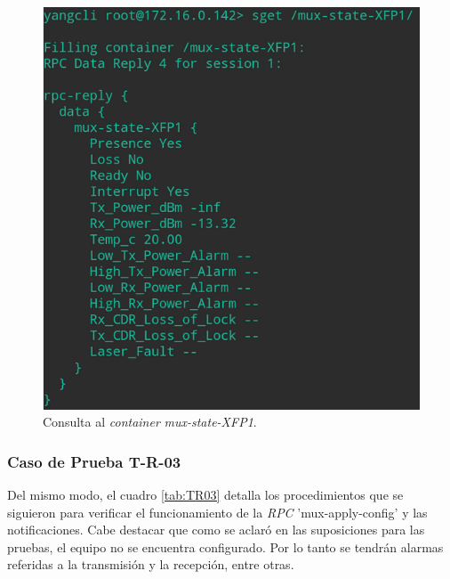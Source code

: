   \begin{figure}[H]
	\centering
	\includegraphics[scale=0.6]{Figures/test2_consulta.png}
	\caption{Consulta al \textit{container} \textit{mux-state-XFP1}.}
	\label{fig:test2_consulta}
  \end{figure}


  \subsubsection{Caso de Prueba T-R-03}
  Del mismo modo, el cuadro \ref{tab:TR03} detalla los procedimientos que se siguieron para verificar el funcionamiento de la  \textit{RPC} 'mux-apply-config' y las notificaciones. Cabe destacar que como se aclaró en las suposiciones para las pruebas, el equipo no se encuentra configurado. Por lo tanto se tendrán alarmas referidas a la transmisión y la recepción, entre otras. 


